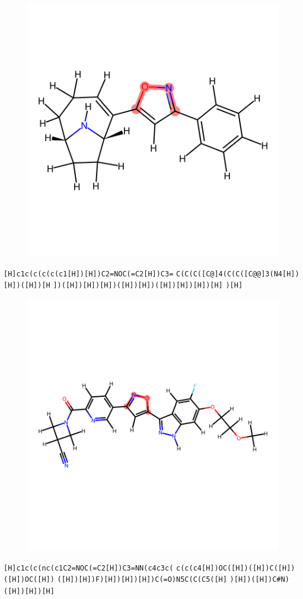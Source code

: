\documentclass{article}
\begin{document}
\begin{figure}[ht]
\centering
    \includegraphics{mol130.png}
\end{figure}
\verb|[H]c1c(c(c(c(c1[H])[H])C2=NOC(=C2[H])C3=| \verb|C(C(C([C@]4(C(C([C@@]3(N4[H])[H])([H])[H| \verb|])([H])[H])[H])([H])[H])([H])[H])[H])[H]| \verb|)[H]|

\clearpage

\begin{figure}[ht]
\centering
    \includegraphics{mol131.png}
\end{figure}
\verb|[H]c1c(c(nc(c1C2=NOC(=C2[H])C3=NN(c4c3c(| \verb|c(c(c4[H])OC([H])([H])C([H])([H])OC([H])| \verb|([H])[H])F)[H])[H])[H])C(=O)N5C(C(C5([H]| \verb|)[H])([H])C#N)([H])[H])[H]|
\end{document}
